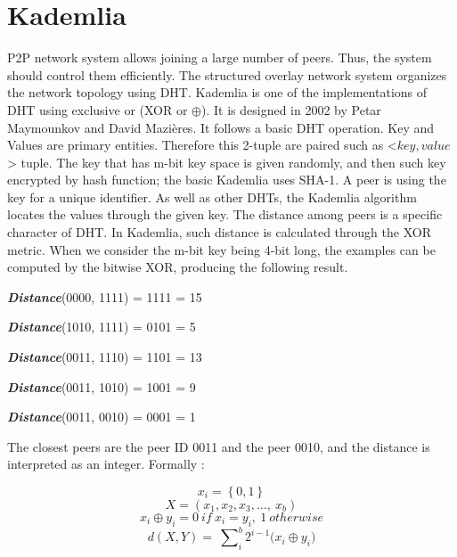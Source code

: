 \section{Kademlia}

P2P network system allows joining a large number of peers. Thus, the system should control them efficiently. The structured overlay network system organizes the network topology using DHT. Kademlia is one of the implementations of DHT using exclusive or (XOR or $\oplus$). It is designed in 2002 by Petar Maymounkov and David Mazières. It follows a basic DHT operation. Key and Values are primary entities. Therefore this 2-tuple are paired such as <$key, value$> tuple. The key that has m-bit key space is given randomly, and then such key encrypted by hash function; the basic Kademlia uses SHA-1. A peer is using the key for a unique identifier. As well as other DHTs, the Kademlia algorithm locates the values through the given key. The distance among peers is a specific character of DHT. In Kademlia, such distance is calculated through the XOR metric. When we consider the m-bit key being 4-bit long, the examples can be computed by the bitwise XOR, producing the following result.

\begin{description}
	\item \textit{\textbf{Distance}}(0000, 1111) = 1111 = 15
	\item \textit{\textbf{Distance}}(1010, 1111) = 0101 = 5
	\item \textit{\textbf{Distance}}(0011, 1110) = 1101 = 13
	\item \textit{\textbf{Distance}}(0011, 1010) = 1001 = 9
	\item \textit{\textbf{Distance}}(0011, 0010) = 0001 = 1
\end{description}

The closest peers are the peer ID 0011 and the peer 0010, and the distance is interpreted as an integer. Formally \cite{lavoie2017xor}:

$$x_{i} = \left\{0, 1\right\}
$$
$$X=\left(x_1,x_2,x_3,\ldots,\ x_b\right)
$$
$$x_i\oplus y_i=0\ if\ x_i=y_i,\ 1\ otherwise
$$
$$d\left(X,Y\right)=\ \sum\nolimits_{i}^{b}{2^{i-1}(x_i\oplus}y_i)
$$


